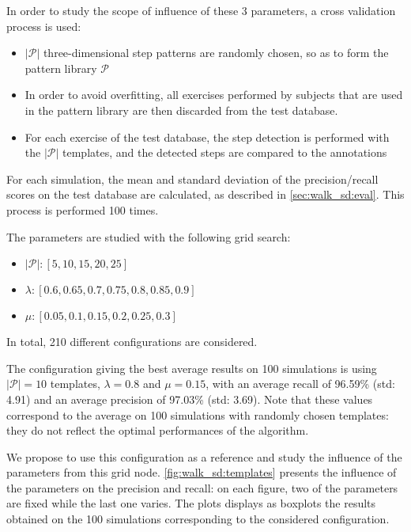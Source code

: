 \documentclass[../thesis.tex]{subfiles}
\begin{document}
In order to study the scope of influence of these 3 parameters,  a cross validation process is used:
\begin{itemize}
 \item  $|\mathcal{P}|$ three-dimensional step patterns are randomly chosen, so as to form the pattern library $\mathcal{P}$ 
\item In order to avoid overfitting, all exercises performed by subjects that are used in the pattern library are then discarded from the test database.
\item For each exercise of the test database, the step detection is performed with the $|\mathcal{P}|$ templates, and  the detected steps are compared to the annotations 
\end{itemize}
For each simulation,  the mean and standard deviation of the precision/recall scores on the test database are calculated, as described in \autoref{sec:walk_sd:eval}. This process is performed 100 times.


The parameters are studied with the following grid search:
\begin{itemize}
 \item $|\mathcal{P}| : [5, 10, 15, 20, 25]$
\item $\lambda : [0.6, 0.65, 0.7, 0.75, 0.8, 0.85, 0.9]$
\item $\mu : [0.05,0.1, 0.15, 0.2, 0.25, 0.3]$
\end{itemize}
In total, 210 different configurations are considered.


The configuration giving the best average results on 100 simulations is using $|\mathcal{P}| = 10$ templates, $\lambda = 0.8$ and $\mu = 0.15$, with an average recall of 96.59\% (std: 4.91) and an average precision of 97.03\% (std: 3.69). Note that these values correspond to the average on 100 simulations with randomly chosen templates: they do not reflect the optimal performances of the algorithm.

We propose to use this configuration as a reference and study the influence of the parameters from this grid node. \autoref{fig:walk_sd:templates} presents the influence of the parameters on the precision and recall: on each figure, two of the parameters are fixed while the last one varies. The plots displays as boxplots the results obtained on the 100 simulations corresponding to the considered configuration.
\end{document}
